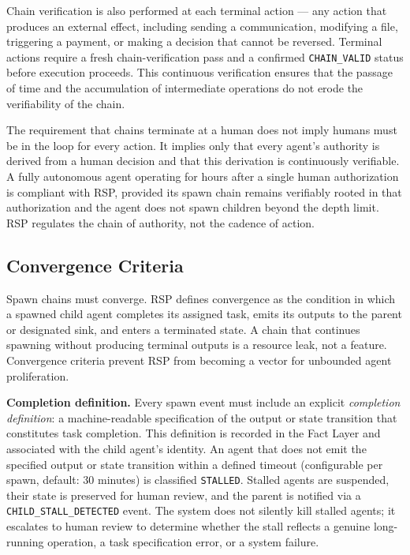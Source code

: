 Chain verification is also performed at each terminal action — any action that produces an external effect, including sending a communication, modifying a file, triggering a payment, or making a decision that cannot be reversed. Terminal actions require a fresh chain-verification pass and a confirmed \texttt{CHAIN\_VALID} status before execution proceeds. This continuous verification ensures that the passage of time and the accumulation of intermediate operations do not erode the verifiability of the chain.

The requirement that chains terminate at a human does not imply humans must be in the loop for every action. It implies only that every agent's authority is derived from a human decision and that this derivation is continuously verifiable. A fully autonomous agent operating for hours after a single human authorization is compliant with RSP, provided its spawn chain remains verifiably rooted in that authorization and the agent does not spawn children beyond the depth limit. RSP regulates the chain of authority, not the cadence of action.

\subsection{Convergence Criteria}

Spawn chains must converge. RSP defines convergence as the condition in which a spawned child agent completes its assigned task, emits its outputs to the parent or designated sink, and enters a terminated state. A chain that continues spawning without producing terminal outputs is a resource leak, not a feature. Convergence criteria prevent RSP from becoming a vector for unbounded agent proliferation.

\textbf{Completion definition.} Every spawn event must include an explicit \textit{completion definition}: a machine-readable specification of the output or state transition that constitutes task completion. This definition is recorded in the Fact Layer and associated with the child agent's identity. An agent that does not emit the specified output or state transition within a defined timeout (configurable per spawn, default: 30 minutes) is classified \texttt{STALLED}. Stalled agents are suspended, their state is preserved for human review, and the parent is notified via a \texttt{CHILD\_STALL\_DETECTED} event. The system does not silently kill stalled agents; it escalates to human review to determine whether the stall reflects a genuine long-running operation, a task specification error, or a system failure.

